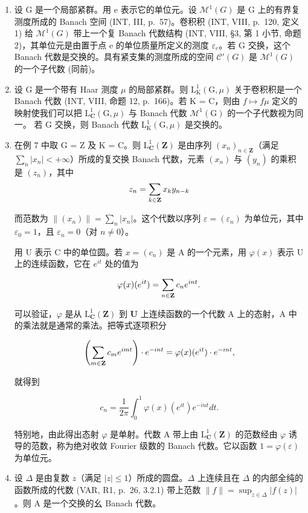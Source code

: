 \begin{enumerate}
\item
  设 G 是一个局部紧群。用 e 表示它的单位元。设 \(\mathcal{M}^{1}(G)\) 是 G 上的有界复测度所成的 Banach 空间 (INT, III, p.~57)。卷积积 (INT, VIII, p.~120, 定义 1) 给 \(\mathcal{M}^{1}(G)\) 带上一个复 Banach 代数结构 (INT, VIII, §3, 第 1 小节, 命题 2)，其单位元是由置于点 e 的单位质量所定义的测度 \(\varepsilon_{e}\)。若 G 交换，这个 Banach 代数是交换的。具有紧支集的测度所成的空间 \(\mathcal{C}'(G)\) 是 \(\mathcal{M}^{1}(G)\) 的一个子代数 (同前)。
\item
  设 G 是一个带有 Haar 测度 \(\mu\) 的局部紧群。则 \(\mathrm{L}_{\mathrm{K}}^{1}(\mathrm{G},\mu)\) 关于卷积积是一个 Banach 代数 (INT, VIII, 命题 12, p.~166)。若 K = C，则由 \(f \mapsto f \mu\) 定义的映射使我们可以把 \(\mathrm{L}_{\mathbf{C}}^{1}(\mathrm{G},\mu)\) 与 Banach 代数 \(\mathcal{M}^{1}(\mathrm{G})\) 的一个子代数视为同一。
若 G 交换，则 Banach 代数 \(\mathrm{L}_{\mathrm{K}}^{1}(\mathrm{G},\mu)\) 是交换的。

\item
  在例 7 中取 G = Z 及 K = C。则 \(\mathrm{L}_{\mathbf{C}}^{1}(\mathbf{Z})\) 是由序列 \((x_{n})_{n\in\mathbf{Z}}\)（满足 \(\sum_{n}|x_{n}|<+\infty\)）所成的复交换 Banach 代数，元素 \((x_{n})\) 与 \((y_{n})\) 的乘积是 \((z_{n})\)，其中
\[
z _ {n} = \sum_ {k \in {\bf Z}} x _ {k} y _ {n - k}
\]

而范数为 \(\|(x_{n})\|=\sum_{n}|x_{n}|\)。这个代数以序列 \(\varepsilon=(\varepsilon_{n})\) 为单位元，其中 \(\varepsilon_{0}=1\)，且 \(\varepsilon_{n}=0\)（对 \(n\neq0\)）。

用 U 表示 C 中的单位圆。若 \(x = (c_{n})\) 是 A 的一个元素，用 \(\varphi(x)\) 表示 U 上的连续函数，它在 \(e^{it}\) 处的值为

\[
\varphi (x) (e ^ {i t}) = \sum_ {n \in {\bf Z}} c _ {n} e ^ {i n t}.
\]

可以验证，\(\varphi\) 是从 \(\mathrm{L}_{\mathbf{C}}^{1}(\mathbf{Z})\) 到 \(\mathbf{U}\) 上连续函数的一个代数 A 上的态射，A 中的乘法就是通常的乘法。把等式逐项积分

\[
\left(\sum_ {m \in {\bf Z}} c _ {m} e ^ {i m t}\right) \cdot e ^ {- i n t} = \varphi (x) (e ^ {i t}) \cdot e ^ {- i n t},
\]

就得到

\[
c _ {n} = \frac {1}{2 \pi} \int_ {0} ^ {1} \varphi (x) (e ^ {i t}) e ^ {- i n t} d t.
\]

特别地，由此得出态射 \(\varphi\) 是单射。代数 A 带上由 \(\mathrm{L}_{\mathbf{C}}^{1}(\mathbf{Z})\) 的范数经由 \(\varphi\) 诱导的范数，称为绝对收敛 Fourier 级数的 Banach 代数。它以函数 \(1 = \varphi(\varepsilon)\) 为单位元。

\item
  设 \(\Delta\) 是由复数 \(z\)（满足 \(|z| \leqslant 1\)）所成的圆盘。\(\Delta\) 上连续且在 \(\Delta\) 的内部全纯的函数所成的代数 (VAR, R1, p.~26, 3.2.1) 带上范数 \(\|f\| = \sup_{z \in \Delta} |f(z)|\)。则 A 是一个交换的幺 Banach 代数。
\end{enumerate}

